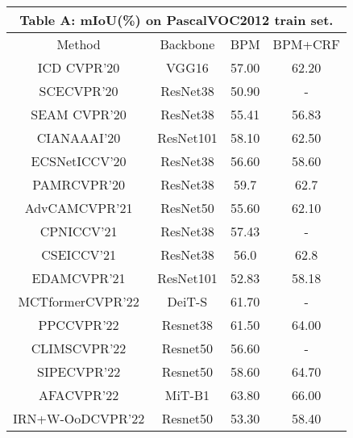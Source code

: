 \documentclass[runningheads]{styles/llncs}
\begin{document}
\noindent
\begin{minipage}[t]{\textwidth}
  \begin{minipage}[b]{0.499\textwidth}\label{tab:BPM}
     \centering
     \resizebox{0.98\textwidth}{!}
     {\begin{tabular}{|c | c | c | c | } 
        \multicolumn{4}{c}{{\bf Table A}: mIoU(\%) on PascalVOC2012 train set.}\\
        \hline
        \rowcolor[gray]{.85}
         Method &  Backbone & BPM             & BPM{+}CRF \\ \hline\hline
             ICD \cite{Fan_2020_CVPR}\tiny{\textsc{CVPR'20} } &  VGG16 &  57.00 &   62.20 \\
             SCE\cite{chang2020weakly}\tiny{\textsc{CVPR'20}} &  ResNet38 &  50.90 & -  \\
             SEAM \cite{wang2020self}\tiny{\textsc{CVPR'20} }&  ResNet38 & 55.41 & 56.83  \\
             CIAN\cite{Fan2020CIANCA}\tiny{\textsc{AAAI'20}} & ResNet101 &  58.10 & 62.50 \\ 
             ECSNet\cite{sun2021ecs}\tiny{\textsc{ICCV'20}} & ResNet38 &  56.60 & 58.60 \\
             PAMR\cite{araslanov2020single}\tiny{\textsc{CVPR'20} } &ResNet38 & 59.7  & 62.7\\
             AdvCAM\cite{lee2021anti}\tiny{\textsc{CVPR'21} } & ResNet50 & 55.60 &  62.10 \\ 
             CPN\cite{zhang2021complementary}\tiny{\textsc{ICCV'21} } & ResNet38 &  57.43 & - \\
             CSE\cite{kweon2021unlocking}\tiny{\textsc{ICCV'21} } & ResNet38 &56.0 & 62.8\\
             EDAM\cite{wu2021embedded}\tiny{\textsc{CVPR'21} } &  ResNet101 &  52.83 &  58.18 \\
             MCTformer\cite{xu2022multi}\tiny{\textsc{CVPR'22} } &  DeiT-S &  61.70 &  - \\
             PPC\cite{du2022weakly}\tiny{\textsc{CVPR'22} } & Resnet38 &  61.50 &  64.00\\
             CLIMS\cite{xie2022clims}\tiny{\textsc{CVPR'22} } & Resnet50 &  56.60 &  -\\
             SIPE\cite{chen2022self}\tiny{\textsc{CVPR'22} } & Resnet50 &  58.60 & 64.70\\
             AFA\cite{ru2022learning}\tiny{\textsc{CVPR'22} } & MiT-B1 &  63.80 & 66.00\\
             IRN+W-OoD\cite{lee2022weakly}\tiny{\textsc{CVPR'22} } & Resnet50&  53.30 & 58.40\\

\end{tabular}}
\end{minipage}
\end{minipage}
\end{document}
